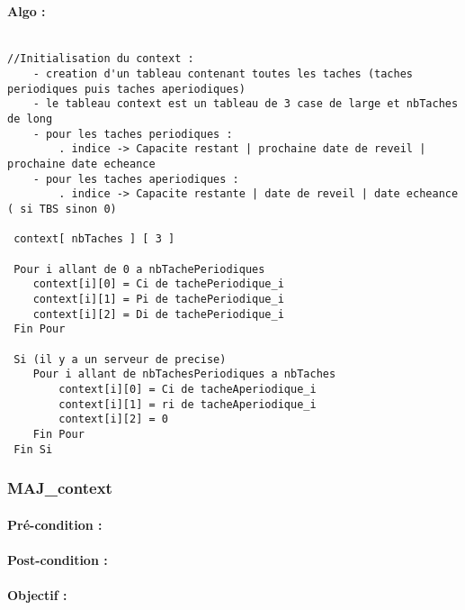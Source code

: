 				\paragraph{Algo :} 
					\begin{verbatim}

//Initialisation du context : 
 	- creation d'un tableau contenant toutes les taches (taches periodiques puis taches aperiodiques)
 	- le tableau context est un tableau de 3 case de large et nbTaches de long
 	- pour les taches periodiques :
 		. indice -> Capacite restant | prochaine date de reveil | prochaine date echeance
 	- pour les taches aperiodiques : 
 		. indice -> Capacite restante | date de reveil | date echeance ( si TBS sinon 0)
 		 
 context[ nbTaches ] [ 3 ]
 
 Pour i allant de 0 a nbTachePeriodiques
 	context[i][0] = Ci de tachePeriodique_i
 	context[i][1] = Pi de tachePeriodique_i
 	context[i][2] = Di de tachePeriodique_i
 Fin Pour
 
 Si (il y a un serveur de precise)
 	Pour i allant de nbTachesPeriodiques a nbTaches
 		context[i][0] = Ci de tacheAperiodique_i
 		context[i][1] = ri de tacheAperiodique_i
 		context[i][2] = 0 
 	Fin Pour
 Fin Si
					\end{verbatim}			
					
			\subsubsection{MAJ\_context}
				\paragraph{Pré-condition :} 
				\paragraph{Post-condition :} 
				\paragraph{Objectif :} 
